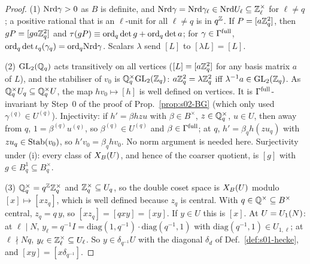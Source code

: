 \begin{proof}
(1) $\mathrm{Nrd}\gamma>0$ as $B$ is definite, and $\mathrm{Nrd}\gamma=\mathrm{Nrd}\gamma_\ell\in\mathrm{Nrd} U_\ell\subseteq\mathbb{Z}_\ell^\times$ for $\ell\ne q$; a positive
rational that is an $\ell$-unit for all $\ell\ne q$ is in $q^{\mathbb{Z}}$. If $P=[a\mathbb{Z}_q^2]$, then $gP=[ga\mathbb{Z}_q^2]$ and $\tau(gP)\equiv\mathrm{ord}_q\det g+
\mathrm{ord}_q\det a$; for $\gamma\in\Gamma^{\rm full}$, $\mathrm{ord}_q\det\iota_q(\gamma_q)=\mathrm{ord}_q\mathrm{Nrd}\gamma$. Scalars $\lambda$ send $[L]$ to $[\lambda L]=[L]$.

(2) $\mathrm{GL}_2(\mathbb{Q}_q)$ acts transitively on all vertices ($[L]=[a\mathbb{Z}_q^2]$ for any basis matrix $a$ of $L$), and the stabiliser of $v_0$ is
$\mathbb{Q}_q^\times\mathrm{GL}_2(\mathbb{Z}_q)$: $a\mathbb{Z}_q^2=\lambda\mathbb{Z}_q^2$ iff $\lambda^{-1}a\in\mathrm{GL}_2(\mathbb{Z}_q)$. As $\mathbb{Q}_q^\times U_q\subseteq\mathbb{Q}_q^\times U$, the map
$hv_0\mapsto[h]$ is well defined on vertices. It is $\Gamma^{\rm full}$-invariant by Step~0 of the proof of Prop.~\ref{prop:s02-BG}
(which only used $\gamma^{(q)}\in U^{(q)}$). Injectivity: if $h'=\beta hzu$ with $\beta\in B^\times$, $z\in\mathbb{Q}_q^\times$, $u\in U$,
then away from $q$, $1=\beta^{(q)}u^{(q)}$, so $\beta^{(q)}\in U^{(q)}$ and $\beta\in\Gamma^{\rm full}$; at $q$, $h'=\beta_qh(zu_q)$ with $zu_q\in\operatorname{Stab}(v_0)$, so
$h'v_0=\beta_qhv_0$. No norm argument is needed here. Surjectivity under (i): every class of $X_B(U)$, and hence of the coarser
quotient, is $[g]$ with $g\in B^1_q\subseteq B_q^\times$.

(3) $\mathbb{Q}_q^\times=q^{\mathbb{Z}}\mathbb{Z}_q^\times$ and $\mathbb{Z}_q^\times\subseteq U_q$, so the double coset space is $X_B(U)$ modulo $[x]\mapsto[xz_q]$, which is
well defined because $z_q$ is central. With $q\in\mathbb{Q}^\times\subseteq B^\times$ central, $z_q=q\,y$, so $[xz_q]=[qxy]=[xy]$. If $y\in U$ this
is $[x]$. At $U=U_1(N)$: at $\ell\mid N$, $y_\ell=q^{-1}I=\mathrm{diag}(1,q^{-1})\cdot\mathrm{diag}(q^{-1},1)$ with
$\mathrm{diag}(q^{-1},1)\in U_{1,\ell}$; at $\ell\nmid Nq$, $y_\ell\in\mathbb{Z}_\ell^\times\subseteq U_\ell$. So $y\in\delta_{q^{-1}}U$ with the diagonal
$\delta_d$ of Def.~\ref{def:s01-hecke}, and $[xy]=[x\delta_{q^{-1}}]$.
\end{proof}
